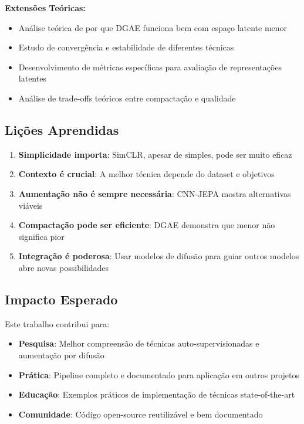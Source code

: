 \textbf{Extensões Teóricas:}
\begin{itemize}
    \item Análise teórica de por que DGAE funciona bem com espaço latente menor
    \item Estudo de convergência e estabilidade de diferentes técnicas
    \item Desenvolvimento de métricas específicas para avaliação de representações latentes
    \item Análise de trade-offs teóricos entre compactação e qualidade
\end{itemize}

\subsection{Lições Aprendidas}

\begin{enumerate}
    \item \textbf{Simplicidade importa}: SimCLR, apesar de simples, pode ser muito eficaz
    \item \textbf{Contexto é crucial}: A melhor técnica depende do dataset e objetivos
    \item \textbf{Aumentação não é sempre necessária}: CNN-JEPA mostra alternativas viáveis
    \item \textbf{Compactação pode ser eficiente}: DGAE demonstra que menor não significa pior
    \item \textbf{Integração é poderosa}: Usar modelos de difusão para guiar outros modelos abre novas possibilidades
\end{enumerate}

\subsection{Impacto Esperado}

Este trabalho contribui para:

\begin{itemize}
    \item \textbf{Pesquisa}: Melhor compreensão de técnicas auto-supervisionadas e aumentação por difusão
    \item \textbf{Prática}: Pipeline completo e documentado para aplicação em outros projetos
    \item \textbf{Educação}: Exemplos práticos de implementação de técnicas state-of-the-art
    \item \textbf{Comunidade}: Código open-source reutilizável e bem documentado
\end{itemize}
